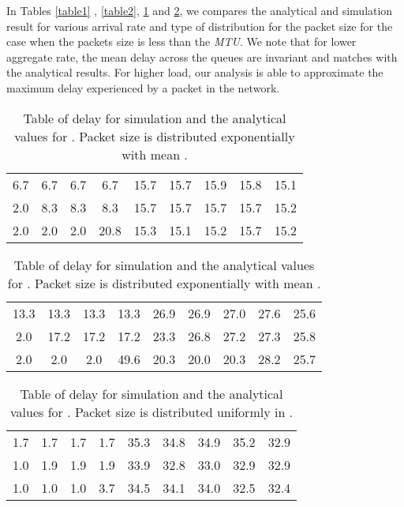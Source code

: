 \documentclass[10pt, conference, compsocconf]{IEEEtran}
\begin{document}
In Tables \ref{table1} , \ref{table2}, \ref{table3} and \ref{table4}, we compares the analytical and simulation result for various arrival rate and type of distribution for the packet size for the case when the packets size is less than the \textit{MTU}. We note that for lower aggregate rate, the mean delay across the queues are invariant and matches with the analytical results. For higher load, our analysis is able to approximate the maximum delay experienced by a packet in the network.

\begin{table}[!h]
\caption{Table of delay for simulation and the analytical values for . Packet size is distributed exponentially with mean .  }
\begin{center}
\begin{tabular}{|c|c|c|c|c|c|c|c|c|}
\hline  &  &  &  &  &  &  &  &   \\ 
\hline  6.7 & 6.7 & 6.7 & 6.7 & 15.7 & 15.7 & 15.9 & 15.8 & 15.1 \\ 
\hline  2.0 & 8.3 & 8.3 & 8.3 & 15.7 & 15.7 & 15.7 & 15.7 & 15.2 \\  
\hline  2.0 & 2.0 & 2.0 & 20.8 & 15.3 & 15.1 & 15.2 & 15.7 & 15.2 \\ 
\hline 
\end{tabular} 
\end{center}
\label{table3}
\end{table}

\begin{table}[!h]
\caption{Table of delay for simulation and the analytical values for . Packet size is distributed exponentially with mean .  }
\begin{center}
\begin{tabular}{|c|c|c|c|c|c|c|c|c|}
\hline  &  &  &  &  &  &  &  &   \\ 
\hline  13.3 & 13.3 & 13.3 & 13.3 & 26.9 & 26.9 & 27.0 & 27.6 & 25.6 \\  
\hline  2.0 & 17.2 & 17.2 & 17.2 & 23.3 & 26.8 & 27.2 & 27.3 & 25.8 \\ 
\hline  2.0 &  2.0 & 2.0  & 49.6 & 20.3 & 20.0 & 20.3 & 28.2 & 25.7 \\ 
\hline 
\end{tabular} 
\end{center}
\label{table4}
\end{table}

\begin{table}[!h]
\caption{Table of delay for simulation and the analytical values for . Packet size is distributed uniformly in .  }
\begin{center}
\begin{tabular}{|c|c|c|c|c|c|c|c|c|}
\hline  &  &  &  &  &  &  &  &   \\ 
\hline  1.7 & 1.7 & 1.7 & 1.7 & 35.3 & 34.8 & 34.9 & 35.2 & 32.9 \\ 
\hline  1.0 & 1.9 & 1.9 & 1.9 & 33.9 & 32.8 & 33.0 & 32.9 & 32.9 \\ 
\hline  1.0 & 1.0 & 1.0 & 3.7 & 34.5 & 34.1 & 34.0 & 32.5 & 32.4 \\ 
\hline 
\end{tabular} 
\end{center}
\label{table5}
\end{table}
\end{document}
